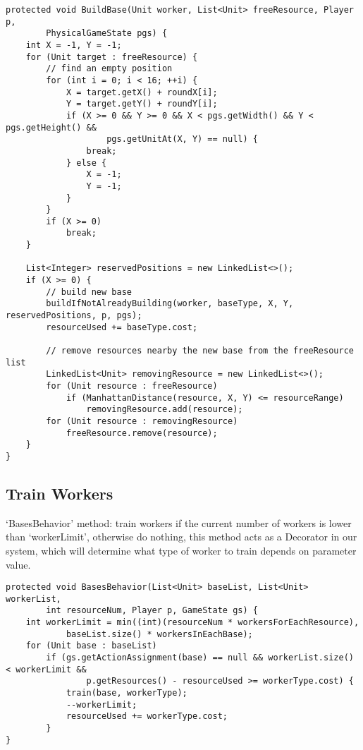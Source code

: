 \begin{verbatim}
protected void BuildBase(Unit worker, List<Unit> freeResource, Player p,
        PhysicalGameState pgs) {
    int X = -1, Y = -1;
    for (Unit target : freeResource) {
        // find an empty position
        for (int i = 0; i < 16; ++i) {
            X = target.getX() + roundX[i];
            Y = target.getY() + roundY[i];
            if (X >= 0 && Y >= 0 && X < pgs.getWidth() && Y < pgs.getHeight() &&
                    pgs.getUnitAt(X, Y) == null) {
                break;
            } else {
                X = -1;
                Y = -1;
            }
        }
        if (X >= 0)
            break;
    }

    List<Integer> reservedPositions = new LinkedList<>();
    if (X >= 0) {
        // build new base
        buildIfNotAlreadyBuilding(worker, baseType, X, Y, reservedPositions, p, pgs);
        resourceUsed += baseType.cost;

        // remove resources nearby the new base from the freeResource list
        LinkedList<Unit> removingResource = new LinkedList<>();
        for (Unit resource : freeResource)
            if (ManhattanDistance(resource, X, Y) <= resourceRange)
                removingResource.add(resource);
        for (Unit resource : removingResource)
            freeResource.remove(resource);
    }
}
\end{verbatim}

\subsection{Train Workers}
‘BasesBehavior’ method: train workers if the current number of workers is lower than
‘workerLimit’, otherwise do nothing, this method acts as a Decorator in our system,
which will determine what type of worker to train depends on parameter value.

\begin{verbatim}
protected void BasesBehavior(List<Unit> baseList, List<Unit> workerList,
        int resourceNum, Player p, GameState gs) {
    int workerLimit = min((int)(resourceNum * workersForEachResource),
            baseList.size() * workersInEachBase);
    for (Unit base : baseList)
        if (gs.getActionAssignment(base) == null && workerList.size() < workerLimit &&
                p.getResources() - resourceUsed >= workerType.cost) {
            train(base, workerType);
            --workerLimit;
            resourceUsed += workerType.cost;
        }
}
\end{verbatim}

